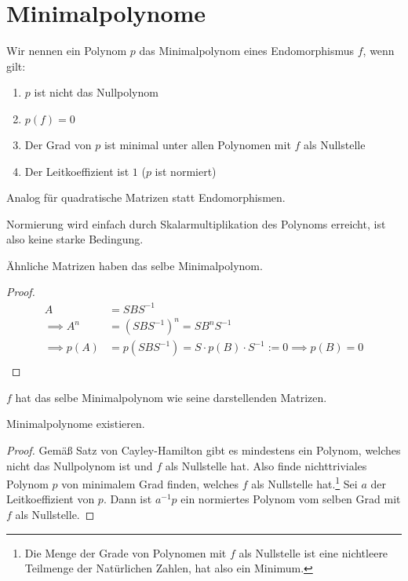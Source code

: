 \documentclass{report}
\newcommand*{\newpar}{\par\vspace{\baselineskip}\noindent}
\begin{document}
\section{Minimalpolynome}
\begin{definition}
Wir nennen ein Polynom $p$ das Minimalpolynom eines Endomorphismus $f$, wenn gilt:
\begin{enumerate}
 \item $p$ ist nicht das Nullpolynom
 \item $p(f) = 0$
 \item Der Grad von $p$ ist minimal unter allen Polynomen mit $f$ als Nullstelle \label{minpoly-3}
 \item Der Leitkoeffizient ist $1$ ($p$ ist normiert) \label{minpoly-4}
\end{enumerate}
Analog für quadratische Matrizen statt Endomorphismen.
\end{definition}
\newpar
Normierung wird einfach durch Skalarmultiplikation des Polynoms erreicht, ist also keine starke Bedingung.
\begin{theorem}
 Ähnliche Matrizen haben das selbe Minimalpolynom.
\end{theorem}
\begin{proof}
 \begin{align*}
  A &= S B S^{-1}\\
  \implies A^n &= (S B S^{-1})^n = S B^n S^{-1}\\
  \implies p(A) &= p(S B S^{-1}) = S \cdot  p(B) \cdot S^{-1} := 0 \implies p(B) = 0\\
 \end{align*}
\end{proof}
\begin{theorem}
 $f$ hat das selbe Minimalpolynom wie seine darstellenden Matrizen.
\end{theorem}
\begin{theorem}
 Minimalpolynome existieren.
\end{theorem}
\begin{proof}
 Gemäß Satz von Cayley-Hamilton gibt es mindestens ein Polynom, welches nicht das Nullpolynom ist und $f$ als Nullstelle hat. Also finde nichttriviales Polynom $p$ von minimalem Grad finden, welches $f$ als Nullstelle hat.\footnote{Die Menge der Grade von Polynomen mit $f$ als Nullstelle ist eine nichtleere Teilmenge der Natürlichen Zahlen, hat also ein Minimum.} Sei $a$ der Leitkoeffizient von $p$. Dann ist $a^{-1}p$ ein normiertes Polynom vom selben Grad mit $f$ als Nullstelle.
\end{proof}
\end{document}
